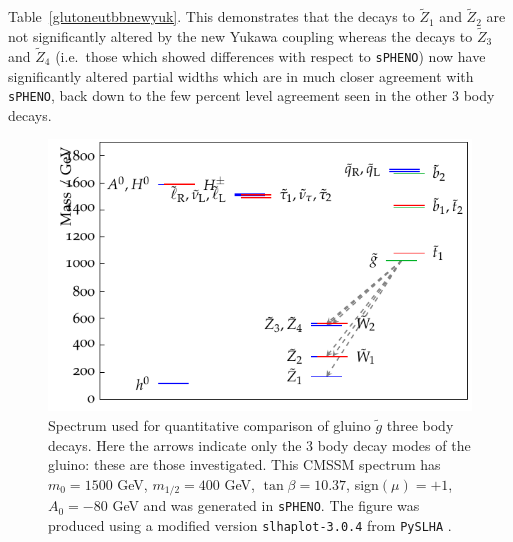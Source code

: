 \documentclass[final,3p,times,pdflatex]{elsarticle}
\begin{document}
Table~\ref{glutoneutbbnewyuk}. This demonstrates that the decays to
$\tilde{Z}_1$ and $\tilde{Z}_2$ are not significantly altered by the new
Yukawa coupling whereas the decays to $\tilde{Z}_3$ and $\tilde{Z}_4$
(i.e.\ those which showed differences with respect to {\tt sPHENO}) now have
significantly altered partial widths which are in much closer agreement with
{\tt sPHENO}, back down to the few percent level agreement seen in the other
3 body decays. 
\begin{figure}
\centerline{\includegraphics[scale=1.2]{figure3.pdf}} 
\caption{Spectrum used for quantitative comparison of gluino $\tilde{g}$ three
  body decays. Here the arrows indicate only the 3 body decay modes of the
  gluino: these are those investigated. This CMSSM spectrum has $m_0 = 1500$
  GeV, $m_{1/2} 
  = 400$ GeV, $\tan\beta = 10.37$, sign$(\mu) = +1$, $A_0 = -80$ GeV and was
  generated 
  in {\tt sPHENO}. 
The figure was produced using a modified version {\tt slhaplot-3.0.4} from
  {\tt PySLHA} \cite{Buckley:2013}.} \label{gluino3bodyspc} 
\end{figure}
\end{document}

